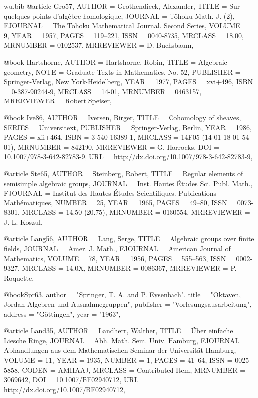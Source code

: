 \documentclass{amsart}
\numberwithin{equation}{section}
\theoremstyle{plain}
\theoremstyle{definition}
\begin{document}
\begin{filecontents}{wu.bib}
	@article {Gro57,
		AUTHOR = {Grothendieck, Alexander},
		TITLE = {Sur quelques points d'alg\`ebre homologique},
		JOURNAL = {T\^ohoku Math. J. (2)},
		FJOURNAL = {The Tohoku Mathematical Journal. Second Series},
		VOLUME = {9},
		YEAR = {1957},
		PAGES = {119--221},
		ISSN = {0040-8735},
		MRCLASS = {18.00},
		MRNUMBER = {0102537},
		MRREVIEWER = {D. Buchsbaum},
	}
	
	@book {Hartshorne,
		AUTHOR = {Hartshorne, Robin},
		TITLE = {Algebraic geometry},
		NOTE = {Graduate Texts in Mathematics, No. 52},
		PUBLISHER = {Springer-Verlag, New York-Heidelberg},
		YEAR = {1977},
		PAGES = {xvi+496},
		ISBN = {0-387-90244-9},
		MRCLASS = {14-01},
		MRNUMBER = {0463157},
		MRREVIEWER = {Robert Speiser},
	}
	
	@book {Ive86,
		AUTHOR = {Iversen, Birger},
		TITLE = {Cohomology of sheaves},
		SERIES = {Universitext},
		PUBLISHER = {Springer-Verlag, Berlin},
		YEAR = {1986},
		PAGES = {xii+464},
		ISBN = {3-540-16389-1},
		MRCLASS = {14F05 (14-01 18-01 54-01)},
		MRNUMBER = {842190},
		MRREVIEWER = {G. Horrocks},
		DOI = {10.1007/978-3-642-82783-9},
		URL = {http://dx.doi.org/10.1007/978-3-642-82783-9},
	}
		
	@article {Ste65,
		AUTHOR = {Steinberg, Robert},
		TITLE = {Regular elements of semisimple algebraic groups},
		JOURNAL = {Inst. Hautes \'Etudes Sci. Publ. Math.},
		FJOURNAL = {Institut des Hautes \'Etudes Scientifiques. Publications
			Math\'ematiques},
		NUMBER = {25},
		YEAR = {1965},
		PAGES = {49--80},
		ISSN = {0073-8301},
		MRCLASS = {14.50 (20.75)},
		MRNUMBER = {0180554},
		MRREVIEWER = {J. L. Koszul},
	}
	
	@article {Lang56,
		AUTHOR = {Lang, Serge},
		TITLE = {Algebraic groups over finite fields},
		JOURNAL = {Amer. J. Math.},
		FJOURNAL = {American Journal of Mathematics},
		VOLUME = {78},
		YEAR = {1956},
		PAGES = {555--563},
		ISSN = {0002-9327},
		MRCLASS = {14.0X},
		MRNUMBER = {0086367},
		MRREVIEWER = {P. Roquette},
	}
	
	@book{Spr63,
		author    = "Springer, T. A. and P. Eysenbach",
		title     = "Oktaven, Jordan-Algebren und Ausnahmegruppen",
		publisher = "Vorlesungsausarbeitung",
		address  = "Göttingen",
		year      = "1963",
	}
	
	@article {Land35,
		AUTHOR = {Landherr, Walther},
		TITLE = {\"{U}ber einfache {L}iesche {R}inge},
		JOURNAL = {Abh. Math. Sem. Univ. Hamburg},
		FJOURNAL = {Abhandlungen aus dem Mathematischen Seminar der Universit\"at
			Hamburg},
		VOLUME = {11},
		YEAR = {1935},
		NUMBER = {1},
		PAGES = {41--64},
		ISSN = {0025-5858},
		CODEN = {AMHAAJ},
		MRCLASS = {Contributed Item},
		MRNUMBER = {3069642},
		DOI = {10.1007/BF02940712},
		URL = {http://dx.doi.org/10.1007/BF02940712},
	}
	

\end{filecontents}
\end{document}
